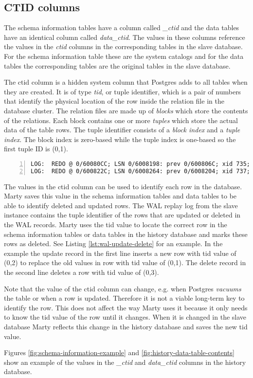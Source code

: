 \subsection{CTID columns}
\label{ch:implementation-history-ctid}
The schema information tables have a column called \textit{\_ctid} and the data tables have an identical column called \textit{data\_ctid}.
The values in these columns reference the values in the \textit{ctid} columns in the corresponding tables in the slave database.
For the schema information table these are the system catalogs and for the data tables the corresponding tables are the original tables in the slave database.

The ctid column is a hidden system column that Postgres adds to all tables when they are created.
It is of type \textit{tid}, or tuple identifier, which is a pair of numbers that identify the physical location of the row inside the relation file in the database cluster.
The relation files are made up of \textit{blocks} which store the contents of the relations.
Each block contains one or more \textit{tuples} which store the actual data of the table rows.
The tuple identifier consists of a \textit{block index} and a \textit{tuple index}.
The block index is zero-based while the tuple index is one-based so the first tuple ID is (0,1).

\begin{lstlisting}[caption={WAL update and delete example},label={lst:wal-update-delete},numbers=left,xleftmargin=2em]
LOG:  REDO @ 0/60080CC; LSN 0/6008198: prev 0/600806C; xid 735; len 37; bkpb0: Heap - update: rel 1663/16384/16385; tid 0/1 xmax 735 ; new tid 0/2 xmax 0
LOG:  REDO @ 0/600822C; LSN 0/6008264: prev 0/6008204; xid 737; len 26: Heap - delete: rel 1663/16384/16385; tid 0/3 KEYS_UPDATED
\end{lstlisting}

The values in the ctid column can be used to identify each row in the database.
Marty saves this value in the schema information tables and data tables to be able to identify deleted and updated rows.
The WAL replay log from the slave instance contains the tuple identifier of the rows that are updated or deleted in the WAL records.
Marty uses the tid value to locate the correct row in the schema information tables or data tables in the history database and marks these rows as deleted.
See Listing \ref{lst:wal-update-delete} for an example.
In the example the update record in the first line inserts a new row with tid value of (0,2) to replace the old values in row with tid value of (0,1).
The delete record in the second line deletes a row with tid value of (0,3).

Note that the value of the ctid column can change, e.g. when Postgres \textit{vacuums} the table or when a row is updated.
Therefore it is not a viable long-term key to identify the row.
This does not affect the way Marty uses it because it only needs to know the tid value of the row until it changes.
When it is changed in the slave database Marty reflects this change in the history database and saves the new tid value.

Figures \ref{fig:schema-information-example} and \ref{fig:history-data-table-contents} show an example of the values in the \textit{\_ctid} and \textit{data\_ctid} columns in the history database.